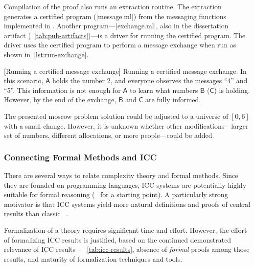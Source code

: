 Compilation of the proof also runs an extraction routine. The extraction
generates a certified  program (\pr|message.ml|) from the messaging
functions implemented in . Another program---\pr|exchange.ml|,
also in the dissertation artifact (\cf~\autoref{tab:pub-artifacts})---is a
{driver} for running the certified program. The driver uses the certified
program to perform a message exchange when run as shown
in~\autoref{lst:run-exchange}.

\begin{center}
\captionsetup{type=lstlisting}
\begin{minipage}{\textwidth}
\end{minipage}
[Running a certified message exchange]{
   Running a certified message exchange. In this scenario, \(\mathsf{A}\) holds
   the number 2, and everyone observes the messages \enquote{4} and \enquote{5}.
   This information is not enough for \(\mathsf{A}\) to learn what numbers
   \(\mathsf{B}\) (\resp \(\mathsf{C}\)) is holding. However, by the end of the
   exchange, \(\mathsf{B}\) and \(\mathsf{C}\) are fully informed.
}\label{lst:run-exchange}
\end{center}

The presented moscow problem solution could be adjusted to a universe of \([0,
6]\) with a small change. However, it is unknown whether other
modifications---\eg larger set of numbers, different allocations, or more
people---could be added.

\subsubsection{Connecting Formal Methods and ICC}
\label{subsubsec:icc-formally}

There are several ways to relate complexity theory and formal methods. Since
they are founded on programming languages, ICC systems are potentially highly
suitable for formal reasoning (\cf~\textcite{cpierce20222} for a starting
point). A particularly strong motivator is that ICC systems yield more natural
definitions and proofs of central results than classic ~\cite{kristiansen2017}.

Formalization of a theory requires significant time and effort.
However, the effort of formalizing ICC results is justified, based on the
continued demonstrated relevance of ICC results -- \cf~\autoref{tab:icc-results},
absence of \emph{formal} proofs among those results, and
maturity of formalization techniques and tools.

